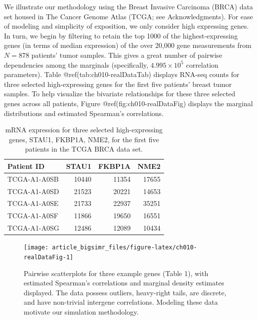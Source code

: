 \documentclass[
]{jss}
\begin{document}
We illustrate our methodology using the Breast Invasive Carcinoma (BRCA)
data set housed in The Cancer Genome Atlas (TCGA; see Acknowledgments).
For ease of modeling and simplicity of exposition, we only consider high
expressing genes. In turn, we begin by filtering to retain the top 1000
of the highest-expressing genes (in terms of median expression) of the
over 20,000 gene measurements from \(N=878\) patients' tumor samples.
This gives a great number of pairwise dependencies among the marginals
(specifically, \(\ensuremath{4.995\times 10^{5}}\) correlation
parameters). Table @ref(tab:ch010-realDataTab) displays RNA-seq counts
for three selected high-expressing genes for the first five patients'
breast tumor samples. To help visualize the bivariate relationships for
these three selected genes across all patients, Figure
@ref(fig:ch010-realDataFig) displays the marginal distributions and
estimated Spearman's correlations.

\begin{CodeChunk}
\begin{table}

\caption{\label{tab:tab:ch010-realDataTab}mRNA expression for three selected high-expressing genes, STAU1, FKBP1A, NME2, for the first five patients in the TCGA BRCA data set.}
\centering
\begin{tabular}[t]{lrrr}
\toprule
Patient ID & STAU1 & FKBP1A & NME2\\
\midrule
TCGA-A1-A0SB & 10440 & 11354 & 17655\\
TCGA-A1-A0SD & 21523 & 20221 & 14653\\
TCGA-A1-A0SE & 21733 & 22937 & 35251\\
TCGA-A1-A0SF & 11866 & 19650 & 16551\\
TCGA-A1-A0SG & 12486 & 12089 & 10434\\
\bottomrule
\end{tabular}
\end{table}

\end{CodeChunk}

\begin{CodeChunk}
\begin{figure}

{\centering \texttt{[image: article\_bigsimr\_files/figure-latex/ch010-realDataFig-1]} 

}

\caption[Pairwise scatterplots for three example genes (Table 1), with estimated Spearman's correlations and marginal density estimates displayed]{Pairwise scatterplots for three example genes (Table 1), with estimated Spearman's correlations and marginal density estimates displayed. The data possess outliers, heavy-right tails, are discrete, and have non-trivial intergene correlations. Modeling these data motivate our simulation methodology.}\label{fig:ch010-realDataFig}
\end{figure}
\end{CodeChunk}
\end{document}
